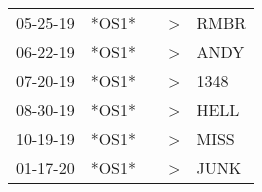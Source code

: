 \begin{supertabular}{lllll}
 05-25-19 &  *OS1* &   &  \textgreater &  RMBR \\
 06-22-19 &  *OS1* &   &  \textgreater &  ANDY \\
 07-20-19 &  *OS1* &   &  \textgreater &  1348 \\
 08-30-19 &  *OS1* &   &  \textgreater &  HELL \\
 10-19-19 &  *OS1* &   &  \textgreater &  MISS \\
 01-17-20 &  *OS1* &   &  \textgreater &  JUNK \\
\end{supertabular}
